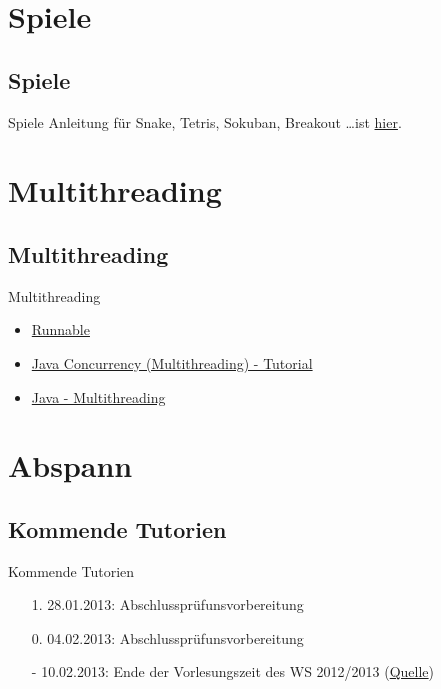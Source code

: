 \documentclass[usepdftitle=false,hyperref={pdfpagelabels=false}]{beamer}
\begin{document}

\section{Spiele}
\subsection{Spiele}
\begin{frame}{Spiele}
  Anleitung für Snake, Tetris, Sokuban, Breakout \dots ist \href{http://zetcode.com/tutorials/javagamestutorial/}{hier}.
\end{frame}

\section{Multithreading}
\subsection{Multithreading}
\begin{frame}{Multithreading}
    \begin{itemize}
        \item \href{http://docs.oracle.com/javase/7/docs/api/java/lang/Runnable.html}{Runnable}
        \item \href{http://www.vogella.com/articles/JavaConcurrency/article.html}{Java Concurrency (Multithreading) - Tutorial}
        \item \href{http://www.tutorialspoint.com/java/java_multithreading.htm}{Java - Multithreading}
    \end{itemize}
\end{frame}

\section{Abspann}
\subsection{Kommende Tutorien}
\begin{frame}{Kommende Tutorien}
  \begin{itemize}
    \item[1.] 28.01.2013: Abschlussprüfunsvorbereitung
    \item[0.] 04.02.2013: Abschlussprüfunsvorbereitung
    \item[-] 10.02.2013: Ende der Vorlesungszeit des WS 2012/2013 (\href{http://www.kit.edu/studieren/2873.php}{Quelle})
  \end{itemize}
\end{frame}

\end{document}
